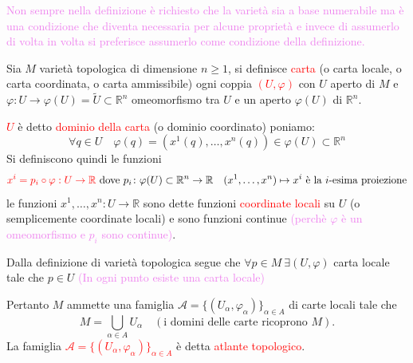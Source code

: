         \textcolor{violet}{Non sempre nella definizione è richiesto che la varietà sia a base numerabile ma è una condizione che diventa necessaria per alcune proprietà e invece 
        di assumerlo di volta in volta si preferisce assumerlo come condizione della definizione.}
        \newpage
        \begin{definizione}
        \mbox{}

        Sia $M$ varietà topologica di dimensione $n \ge 1$, si definisce \textcolor{red}{carta} \textcolor{blu}{(o carta locale, o carta coordinata, o carta ammissibile)} ogni coppia 
        \textcolor{red}{$(U, \varphi)$} con $U$ aperto di $M$ e 
        $\varphi \colon U \to \varphi(U) = \tilde{U} \subset \mathbb{R}^n$ omeomorfismo tra $U$ e un aperto $\varphi(U)$ di $\mathbb{R}^n$.
        
        \textcolor{red}{$U$} è detto \textcolor{red}{dominio della carta} \textcolor{blu}{(o dominio coordinato)} poniamo:
        \[
        \forall q \in U \quad \varphi(q) = \left(x^1(q), \dots, x^n(q)\right) \in \varphi(U) \subset \mathbb{R}^n
        \]
        Si definiscono quindi le funzioni
        \[
        \textcolor{red}{x^i = p_i \circ \varphi : U \to \mathbb{R}} \text{ dove } p_i \colon \varphi(U) \subset \mathbb{R}^n \to \mathbb{R} \quad (x^1, \dots, x^n) \mapsto x^i 
        \text{ è la $i$-esima proiezione}
        \]
        le funzioni $x^1, \dots, x^n : U \to \mathbb{R}$ sono dette funzioni \textcolor{red}{coordinate locali} su $U$ \textcolor{blu}{(o semplicemente coordinate locali)} 
        e sono funzioni continue \textcolor{violet}{(perchè $\varphi$ è un omeomorfismo e $p_i$ sono continue)}.

        Dalla definizione di varietà topologica segue che $\forall p \in M \ \exists (U, \varphi)$ carta locale tale che $p \in U$
        \textcolor{violet}{(In ogni punto esiste una carta locale)}

        Pertanto $M$ ammette una famiglia $\mathcal{A} = \{(U_\alpha, \varphi_\alpha)\}_{\alpha \in A}$ di carte locali tale che
        \[
        M = \bigcup_{\alpha \in A} U_\alpha \quad (\text{i domini delle carte ricoprono } M).
        \]
        La famiglia \textcolor{red}{$\mathcal{A} = \{(U_\alpha, \varphi_\alpha)\}_{\alpha \in A}$} è detta \textcolor{red}{atlante topologico}.
        \end{definizione}

